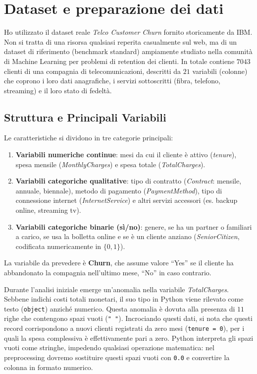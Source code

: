 \documentclass[a4paper,11pt]{article}
\begin{document}
\section{Dataset e preparazione dei dati}
\label{sec:dataset_preparazione}
Ho utilizzato il dataset reale \textit{Telco Customer Churn} fornito storicamente da IBM. Non si tratta di una risorsa qualsiasi reperita casualmente sul web, ma di un dataset di riferimento (benchmark standard) ampiamente studiato nella comunità di Machine Learning per problemi di retention dei clienti. In totale contiene $7043$ clienti di una compagnia di telecomunicazioni, descritti da $21$ variabili (colonne) che coprono i loro dati anagrafiche, i servizi sottoscritti (fibra, telefono, streaming) e il loro stato di fedeltà.

\subsection{Struttura e Principali Variabili}
Le caratteristiche si dividono in tre categorie principali:
\begin{enumerate}
    \item \textbf{Variabili numeriche continue}: mesi da cui il cliente è attivo (\textit{tenure}), spesa mensile (\textit{MonthlyCharges}) e spesa totale (\textit{TotalCharges}).
    \item \textbf{Variabili categoriche qualitative}: tipo di contratto (\textit{Contract}: mensile, annuale, biennale), metodo di pagamento (\textit{PaymentMethod}), tipo di connessione internet (\textit{InternetService}) e altri servizi accessori (es. backup online, streaming tv).
    \item \textbf{Variabili categoriche binarie (sì/no)}: genere, se ha un partner o familiari a carico, se usa la bolletta online e se è un cliente anziano (\textit{SeniorCitizen}, codificata numericamente in $\{0, 1\}$).
\end{enumerate}
La variabile da prevedere è \textbf{Churn}, che assume valore ``Yes'' se il cliente ha abbandonato la compagnia nell'ultimo mese, ``No'' in caso contrario.

Durante l'analisi iniziale emerge un'anomalia nella variabile \textit{TotalCharges}. Sebbene indichi costi totali monetari, il suo tipo in Python viene rilevato come testo (\texttt{object}) anziché numerico. Questa anomalia è dovuta alla presenza di $11$ righe che contengono spazi vuoti (\texttt{" "}). Incrociando questi dati, si nota che questi record corrispondono a nuovi clienti registrati da zero mesi (\texttt{tenure = 0}), per i quali la spesa complessiva è effettivamente pari a zero. Python interpreta gli spazi vuoti come stringhe, impedendo qualsiasi operazione matematica: nel preprocessing dovremo sostituire questi spazi vuoti con \texttt{0.0} e convertire la colonna in formato numerico.
\end{document}
